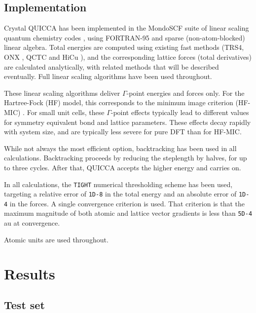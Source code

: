\twolinestyle{\documentclass[prb,preprint]{revtex4}}
\begin{document}
\subsection{Implementation}

Crystal QUICCA has been implemented in the MondoSCF suite of linear scaling 
quantum chemistry codes \cite{MondoSCF}, using FORTRAN-95 and sparse (non-atom-blocked) 
linear algebra.  Total energies are computed using existing fast methods 
(TRS4\cite{ANiklasson03}, ONX \cite{CTymczak05a}, QCTC and HiCu \cite{CTymczak05b}), 
and the corresponding lattice forces 
(total derivatives) are calculated analytically, with related methods that will be 
described eventually. Full linear scaling algorithms have been used throughout.

These linear scaling algorithms deliver $\Gamma$-point energies and forces only.  
For the Hartree-Fock (HF) model, this corresponds to the minimum image criterion 
(HF-MIC) \cite{CTymczak05a}.  For small unit cells, these $\Gamma$-point effects typically lead 
to different values for symmetry equivalent bond and lattice parameters.  These effects 
decay rapidly with system size, and are typically less severe for pure DFT than for HF-MIC.  

While not always the most efficient option, backtracking has been used in all calculations.
Backtracking proceeds by reducing the steplength by halves, for up to three cycles.  
After that, QUICCA accepts the higher energy and carries on.  

In all calculations, the {\tt TIGHT} numerical thresholding scheme \cite{CTymczak05a} has been used, 
targeting a relative error of {\tt 1D-8} in the total energy and an 
absolute error of {\tt 1D-4} in the forces.  A single convergence criterion is used.
That criterion is that the maximum magnitude of both atomic and lattice vector gradients 
is less than {\tt 5D-4} au at convergence.

Atomic units are used throughout.

\section{Results} \label{results}

\subsection{Test set}
\end{document}
